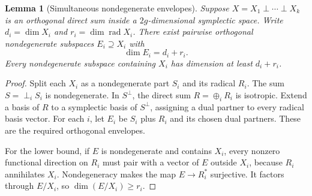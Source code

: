 \documentclass[11pt,letterpaper]{article}
\newtheorem{lemma}[lemma]{Lemma}
\theoremstyle{definition}
\theoremstyle{remark}
\newcommand{\rad}{\operatorname{rad}}
\begin{document}
\begin{lemma}[Simultaneous nondegenerate envelopes]\label{lem:envelopes}
Suppose $X=X_1\perp\cdots\perp X_k$ is an orthogonal direct sum inside a $2g$-dimensional symplectic space. Write $d_i=\dim X_i$ and $r_i=\dim\rad X_i$. There exist pairwise orthogonal nondegenerate subspaces $E_i\supseteq X_i$ with
\[
 \dim E_i=d_i+r_i.
\]
Every nondegenerate subspace containing $X_i$ has dimension at least $d_i+r_i$.
\end{lemma}
\begin{proof}
Split each $X_i$ as a nondegenerate part $S_i$ and its radical $R_i$. The sum $S=\perp_i S_i$ is nondegenerate. In $S^\perp$, the direct sum $R=\oplus_i R_i$ is isotropic. Extend a basis of $R$ to a symplectic basis of $S^\perp$, assigning a dual partner to every radical basis vector. For each $i$, let $E_i$ be $S_i$ plus $R_i$ and its chosen dual partners. These are the required orthogonal envelopes.

For the lower bound, if $E$ is nondegenerate and contains $X_i$, every nonzero functional direction on $R_i$ must pair with a vector of $E$ outside $X_i$, because $R_i$ annihilates $X_i$. Nondegeneracy makes the map $E\to R_i^*$ surjective. It factors through $E/X_i$, so $\dim(E/X_i)\ge r_i$.
\end{proof}
\end{document}
